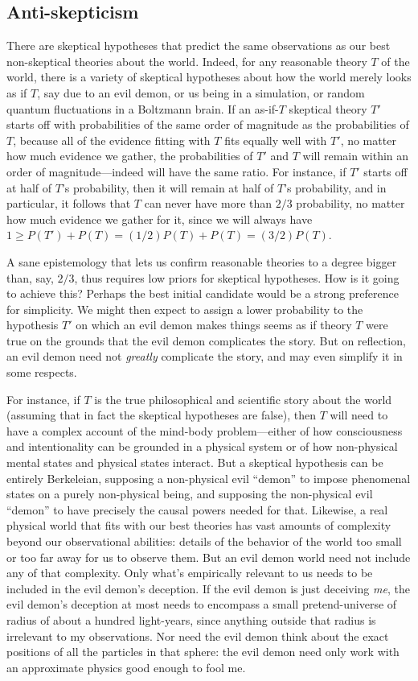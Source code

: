 \subsection{Anti-skepticism}
There are skeptical hypotheses that predict the same observations as our best non-skeptical theories
about the world. Indeed, for any reasonable theory $T$ of the world, there is a variety of skeptical hypotheses about
how the world merely looks as if $T$, say due to an evil demon, or us being in a simulation, or random quantum 
fluctuations in a Boltzmann brain. If an as-if-$T$ skeptical theory $T'$ starts off with probabilities of the same
order of magnitude as the probabilities of $T$, because all of the evidence fitting with $T$ fits equally well with $T'$, 
no matter how much evidence we gather, the probabilities of $T'$ and $T$ will remain within an order of magnitude---indeed will have the same
ratio. For instance, if
$T'$ starts off at half of $T$'s probability, then it will remain at half of $T$'s probability, and in particular, 
it follows that $T$ can never have more than $2/3$ probability, no matter how much evidence we gather for it,
since we will always have $1 \ge P(T')+P(T) = (1/2)P(T)+P(T) = (3/2)P(T)$. 

A sane epistemology that lets us confirm reasonable theories to a degree bigger than, say, $2/3$, thus requires low 
priors for skeptical hypotheses. How is it going to achieve this?
Perhaps the best initial candidate would be a strong preference for simplicity. We might then expect to assign a lower probability to the hypothesis $T'$ 
on which an evil demon makes things seems as if theory $T$ were true on the grounds that the evil demon complicates 
the story. But on reflection, an evil demon need not \textit{greatly} complicate the story, and may even simplify it 
in some respects.

For instance, if $T$ is the true philosophical and scientific story about the world (assuming that in fact
the skeptical hypotheses are false), then $T$ will need to have a complex account of the mind-body problem---either 
of how consciousness and intentionality can be grounded in a physical system or of how non-physical mental states 
and physical states interact. But a skeptical hypothesis can be entirely
Berkeleian, supposing a non-physical evil ``demon'' to impose phenomenal states on a purely non-physical being, and supposing
the non-physical evil ``demon'' to have precisely the causal powers needed for that. Likewise, 
a real physical world that fits with our best theories has vast amounts of complexity beyond our observational
abilities: details of the behavior of the world too small or too far away for us to observe them. But an 
evil demon world need not include any of that complexity. Only what's empirically relevant to us needs to be included 
in the evil demon's deception. If the evil demon is just deceiving \textit{me}, the evil demon's deception at most 
needs to encompass a small pretend-universe of radius of about a hundred light-years, since anything outside that radius is
irrelevant to my observations. Nor need the evil demon think about the exact positions of all the particles in that sphere:
the evil demon need only work with an approximate physics good enough to fool me. 


